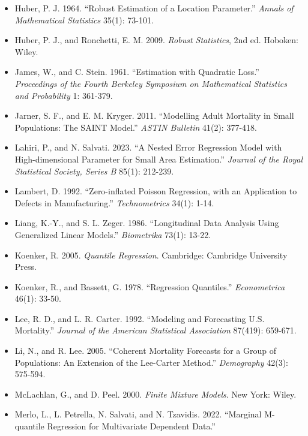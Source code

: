 \documentclass[UTF8, fontset=macnew, a4paper, 12pt]{ctexart}
\begin{document}
\begin{itemize}[leftmargin=2em, itemsep=2pt, parsep=0pt]
        \textit{The Canadian Journal of Statistics} 49(3): 875-905.
  \item[] Huber, P. J. 1964. ``Robust Estimation of a Location Parameter.''
        \textit{Annals of Mathematical Statistics} 35(1): 73-101.
  \item[] Huber, P. J., and Ronchetti, E. M. 2009. \textit{Robust Statistics},
        2nd ed. Hoboken: Wiley.
  \item[] James, W., and C. Stein. 1961. ``Estimation with Quadratic Loss.''
        \textit{Proceedings of the Fourth Berkeley Symposium on Mathematical
        Statistics and Probability} 1: 361-379.
  \item[] Jarner, S. F., and E. M. Kryger. 2011. ``Modelling Adult Mortality in
        Small Populations: The SAINT Model.''
        \textit{ASTIN Bulletin} 41(2): 377-418.
  \item[] Lahiri, P., and N. Salvati. 2023. ``A Nested Error Regression Model
        with High-dimensional Parameter for Small Area Estimation.''
        \textit{Journal of the Royal Statistical Society, Series B} 85(1): 212-239.
  \item[] Lambert, D. 1992. ``Zero-inflated Poisson Regression, with an
        Application to Defects in Manufacturing.''
        \textit{Technometrics} 34(1): 1-14.
  \item[] Liang, K.-Y., and S. L. Zeger. 1986. ``Longitudinal Data Analysis
        Using Generalized Linear Models.'' \textit{Biometrika} 73(1): 13-22.
  \item[] Koenker, R. 2005. \textit{Quantile Regression}. Cambridge: Cambridge
        University Press.
  \item[] Koenker, R., and Bassett, G. 1978. ``Regression Quantiles.''
        \textit{Econometrica} 46(1): 33-50.
  \item[] Lee, R. D., and L. R. Carter. 1992. ``Modeling and Forecasting U.S.
        Mortality.'' \textit{Journal of the American Statistical Association}
        87(419): 659-671.
  \item[] Li, N., and R. Lee. 2005. ``Coherent Mortality Forecasts for a Group of
        Populations: An Extension of the Lee-Carter Method.''
        \textit{Demography} 42(3): 575-594.
  \item[] McLachlan, G., and D. Peel. 2000. \textit{Finite Mixture Models}.
        New York: Wiley.
  \item[] Merlo, L., L. Petrella, N. Salvati, and N. Tzavidis. 2022. ``Marginal
        M-quantile Regression for Multivariate Dependent Data.''

\end{itemize}
\end{document}
